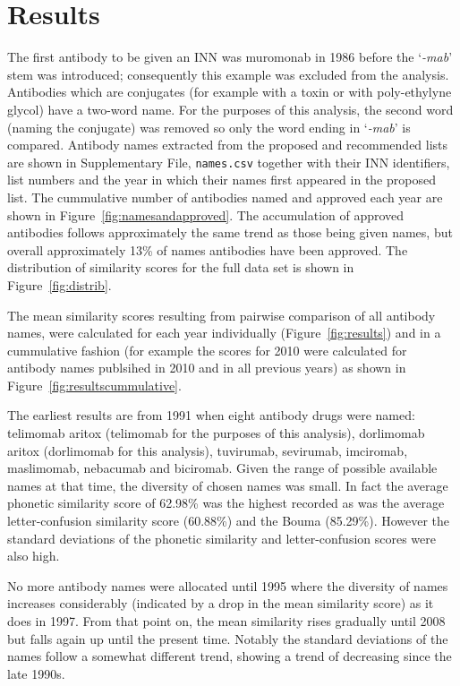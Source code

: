 \documentclass{article}
\newcommand{\eg}[1]{\mbox{`\emph{#1}'}}
\begin{document}
\section{Results}
The first antibody to be given an INN was muromonab in 1986 before the
\eg{-mab} stem was introduced; consequently this example was excluded
from the analysis. Antibodies which are conjugates (for example with a
toxin or with poly-ethylyne glycol) have a two-word name. For the
purposes of this analysis, the second word (naming the conjugate) was
removed so only the word ending in \eg{-mab} is compared.  Antibody
names extracted from the proposed and recommended lists are shown in
Supplementary File, {\tt names.csv} together with their INN
identifiers, list numbers and the year in which their names first
appeared in the proposed list. The cummulative number of antibodies
named and approved each year are shown in
Figure~\ref{fig:namesandapproved}. The accumulation of approved
antibodies follows approximately the same trend as those being given
names, but overall approximately 13\% of names antibodies have been
approved. The distribution of similarity scores for the full data set
is shown in Figure~\ref{fig:distrib}.

The mean similarity scores resulting from pairwise comparison of all
antibody names, were calculated for each year individually
(Figure~\ref{fig:results})
and in a cummulative fashion
(for example the scores for 2010 were calculated for antibody names
publsihed in 2010 and in all previous years) as shown in Figure~\ref{fig:resultscummulative}.

The earliest results are from 1991 when eight antibody drugs were
named: telimomab aritox (telimomab for the purposes of this analysis),
dorlimomab aritox (dorlimomab for this analysis), tuvirumab,
sevirumab, imciromab, maslimomab, nebacumab and biciromab. Given the
range of possible available names at that time, the diversity of
chosen names was small. In fact the average phonetic similarity score
of 62.98\% was the highest recorded as was the average
letter-confusion similarity score (60.88\%) and the Bouma
(85.29\%). However the standard deviations of the phonetic similarity
and letter-confusion scores were also high.

No more antibody names were allocated until 1995 where the diversity
of names increases considerably (indicated by a drop in the mean
similarity score) as it does in 1997. From that point on, the mean
similarity rises gradually until 2008 but falls again up until the
present time. Notably the standard deviations of the names follow a
somewhat different trend, showing a trend of decreasing since the late
1990s. 
\end{document}
